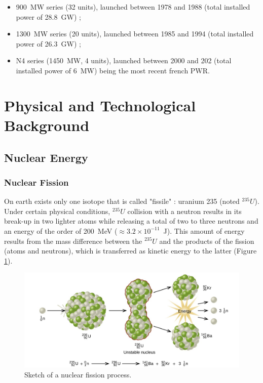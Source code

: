 \begin{itemize}
\item 900~MW series (32 units), launched between 1978 and 1988 (total installed power of 28.8~GW) ;
\item 1300~MW series (20 units), launched between 1985 and 1994 (total installed power of 26.3~GW) ;
\item N4 series (1450~MW, 4 units), launched between 2000 and 202 (total installed power of 6~MW) being the most recent french PWR.
\end{itemize}





\section{Physical and Technological Background}

\subsection{Nuclear Energy}

\subsubsection{Nuclear Fission}

On earth exists only one isotope that is called "fissile" : uranium 235 (noted $^{235}U$). Under certain physical conditions, $^{235}U$ collision with a neutron results in its break-up in two lighter atoms while releasing a total of two to three neutrons and an energy of the order of 200~MeV ($\approx 3.2 \times 10^{-11}$\ J). This amount of energy results from the mass difference between the $^{235}U$ and the products of the fission (atoms and neutrons), which is transferred as kinetic energy to the latter (Figure \ref{fig:fission}).



\begin{figure}[!h]
\centering
\includegraphics[width=0.7\linewidth]{img/intro/fission.jpg}
\caption{Sketch of a nuclear fission process. \cite{chemistry_libretexts_217_2017}}
\label{fig:fission}
\end{figure}

